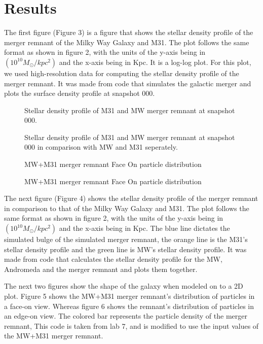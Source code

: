 \documentclass[preprint2, times]{aastex631}
\begin{document}
\section{Results}
The first figure (Figure 3) is a figure that shows the stellar density profile of the merger remnant of the Milky Way Galaxy and M31. The plot follows the same format as shown in figure 2, with the units of the y-axis being in $(10^{10}M_\odot / kpc^2)$ and the x-axis being in Kpc. It is a log-log plot. For this plot, we used high-resolution data for computing the stellar density profile of the merger remnant. It was made from code that simulates the galactic merger and plots the surface density profile at snapshot 000.
\begin{figure}
    \centering
    \caption{Stellar density profile of M31 and MW merger remnant at snapshot 000.}
    \label{fig:galaxy}
\end{figure}
\par
\begin{figure}
    \centering
    \caption{Stellar density profile of M31 and MW merger remnant at snapshot 000 in comparison with MW and M31 seperately.}
    \label{fig:galaxy}
\end{figure}
\begin{figure}
    \centering
    \caption{MW+M31 merger remnant Face On particle distribution}
    \label{fig:galaxy}
\end{figure}
\begin{figure}
    \centering
    \caption{MW+M31 merger remnant Face On particle distribution}
    \label{fig:galaxy}
\end{figure}
The next figure (Figure 4) shows the stellar density profile of the merger remnant in comparison to that of the Milky Way Galaxy and M31. The plot follows the same format as shown in figure 2, with the units of the y-axis being in $(10^{10}M_\odot / kpc^2)$ and the x-axis being in Kpc. The blue line dictates the simulated bulge of the simulated merger remnant, the orange line is the M31's stellar density profile and the green line is MW's stellar density profile. It was made from code that calculates the stellar density profile for the MW, Andromeda and the merger remnant and plots them together.
\par
The next two figures show the shape of the galaxy when modeled on to a 2D plot. Figure 5 shows the MW+M31 merger 
remnant's distribution of particles in a face-on view. Whereas figure 6 shows the remnant's distribution of particles in an edge-on view. The colored bar represents the particle density of the merger remnant, This code is taken from lab 7, 
and is modified to use the input values of the MW+M31 merger remnant. 
\end{document}
